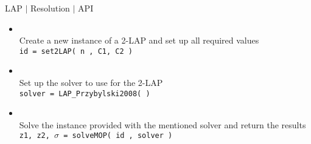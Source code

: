 %
% 
\begin{frame}{LAP $\mid$ Resolution $\mid$ API}

\begin{itemize}
\item  {}\\
          Create a new instance of a 2-LAP and set up all required values    \\
           \texttt{id = \texttt{{set2}LAP( n , C1, C2 ) }} 
           \medskip
\item  {} \\
          Set up the solver to use for the 2-LAP\\
          \texttt{solver = LAP\_Przybylski2008( ) }
          \medskip
\item  {}\\
          Solve the instance provided with the mentioned solver and return the results \\
          \texttt{z1, z2, $\sigma$ = solveMOP( id , solver ) }
\end{itemize}

\end{frame}

